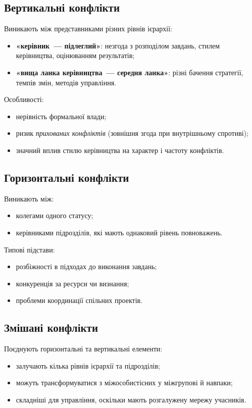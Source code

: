 \documentclass[12pt,a4paper]{article}
\begin{document}
    \subsection*{Вертикальні конфлікти}
    Виникають між представниками різних рівнів ієрархії:
    \begin{itemize}
        \item \textbf{«керівник~--- підлеглий»}: незгода з розподілом завдань, стилем керівництва, оцінюванням результатів;
        \item \textbf{«вища ланка керівництва~--- середня ланка»}: різні бачення стратегії, темпів змін, методів управління.
    \end{itemize}

    Особливості:
    \begin{itemize}
        \item нерівність формальної влади;
        \item ризик \textit{прихованих конфліктів} (зовнішня згода при внутрішньому спротиві);
        \item значний вплив стилю керівництва на характер і частоту конфліктів.
    \end{itemize}

    \subsection*{Горизонтальні конфлікти}
    Виникають між:
    \begin{itemize}
        \item колегами одного статусу;
        \item керівниками підрозділів, які мають однаковий рівень повноважень.
    \end{itemize}

    Типові підстави:
    \begin{itemize}
        \item розбіжності в підходах до виконання завдань;
        \item конкуренція за ресурси чи визнання;
        \item проблеми координації спільних проектів.
    \end{itemize}

    \subsection*{Змішані конфлікти}
    Поєднують горизонтальні та вертикальні елементи:
    \begin{itemize}
        \item залучають кілька рівнів ієрархії та підрозділів;
        \item можуть трансформуватися з міжособистісних у міжгрупові й навпаки;
        \item складніші для управління, оскільки мають розгалужену мережу учасників.
    \end{itemize}
\end{document}
